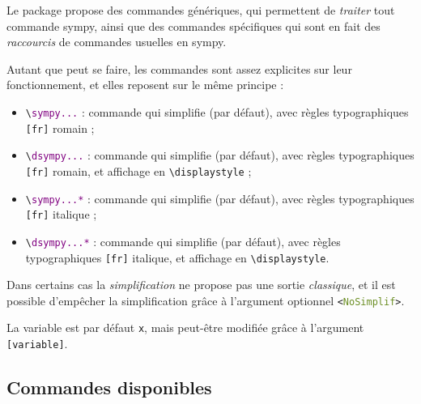 \documentclass[french,a4paper,11pt]{article}
\begin{document}
\begin{noteblock}
Le package propose des commandes génériques, qui permettent de \textit{traiter} tout commande \textsf{sympy}, ainsi que des commandes spécifiques qui sont en fait des \textit{raccourcis} de commandes usuelles en \textsf{sympy}.

\smallskip

Autant que peut se faire, les commandes sont assez explicites sur leur fonctionnement, et elles reposent sur le même principe :

\begin{itemize}
	\item \texttt{\textbackslash \textcolor{purple}{sympy...}} : commande qui simplifie (par défaut), avec règles typographiques \texttt{[fr]} \textsf{romain} ;
	\item \texttt{\textbackslash \textcolor{purple}{dsympy...}} : commande qui simplifie (par défaut), avec règles typographiques \texttt{[fr]} \textsf{romain}, et affichage en \texttt{\textbackslash displaystyle} ;
	\item \texttt{\textbackslash \textcolor{purple}{sympy...*}} : commande qui simplifie (par défaut), avec règles typographiques \texttt{[fr]} \textsf{italique} ;
	\item \texttt{\textbackslash \textcolor{purple}{dsympy...*}} : commande qui simplifie (par défaut), avec règles typographiques \texttt{[fr]} \textsf{italique}, et affichage en \texttt{\textbackslash displaystyle}.
\end{itemize}

Dans certains cas la \textit{simplification} ne propose pas une sortie \textit{classique}, et il est possible d'empêcher la simplification grâce à l'argument optionnel \texttt{<\textcolor{OliveDrab}{NoSimplif}>}.

\smallskip

La variable est par défaut \texttt{x}, mais peut-être modifiée grâce à l'argument \texttt{[variable]}.
\end{noteblock}

\subsection{Commandes disponibles}
\end{document}
